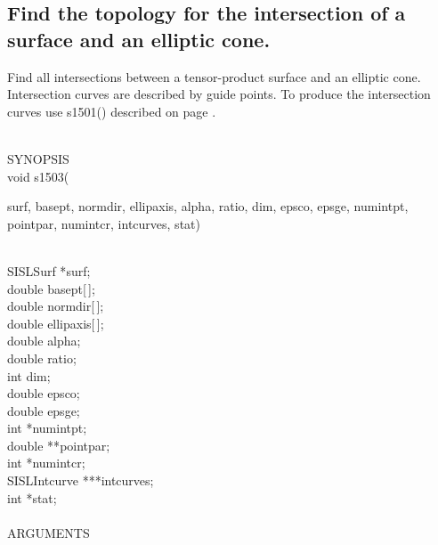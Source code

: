 \subsection{Find the topology for the intersection of a surface and an
\mbox{elliptic} cone.}
\begin{minipg1}
  Find all intersections between a tensor-product surface and an elliptic cone.
  Intersection curves are described by guide points.
  To produce the intersection curves use s1501() described on page \pageref{s1501}.
\end{minipg1} \\
SYNOPSIS\\
        \>void s1503(\begin{minipg3}
                        {\fov surf}, {\fov basept}, {\fov normdir}, {\fov ellipaxis}, {\fov alpha}, {\fov ratio}, {\fov dim}, {\fov epsco}, {\fov epsge}, {\fov numintpt}, {\fov pointpar},
                        {\fov numintcr}, {\fov intcurves}, {\fov stat})
                \end{minipg3}\\[0.3ex]
                \>\>    SISLSurf        \>      *{\fov surf};\\
                \>\>    double  \>      {\fov basept}[\,];\\
                \>\>    double  \>      {\fov normdir}[\,];\\
                \>\>    double  \>      {\fov ellipaxis}[\,];\\
                \>\>    double  \>      {\fov alpha};\\
                \>\>    double  \>      {\fov ratio};\\
                \>\>    int     \>      {\fov dim};\\
                \>\>    double  \>      {\fov epsco};\\
                \>\>    double  \>      {\fov epsge};\\
                \>\>    int     \>      *{\fov numintpt};\\
                \>\>    double  \>      **{\fov pointpar};\\
                \>\>    int     \>      *{\fov numintcr};\\
                \>\>    SISLIntcurve\>  ***{\fov intcurves};\\
                \>\>    int     \>      *{\fov stat};\\
\\
ARGUMENTS\\
